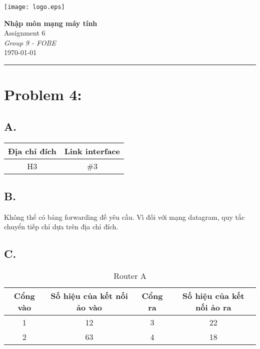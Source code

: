 \documentclass[12pt,a4paper]{article}
\begin{document}
\textcolor{UM_Brown}{
\begin{minipage}{0.1\textwidth}
    \begin{flushleft}
        \texttt{[image: logo.eps]}
    \end{flushleft}
\end{minipage}
\begin{minipage}{0.8\textwidth}
    \begin{center}
        \textbf{\Large Nhập môn mạng máy tính}\\
        \vspace{5pt}
        Assignment 6 \\
        \vspace{10pt}
        \textit{Group 9 - FOBE} \\
        \vspace{5pt}
        \longdate\today
    \end{center}
\end{minipage}
\vspace{10pt}
\hrule
}

\section*{Problem 4:}
\subsection*{A.}
\begin{table}[H]
    \centering
    \begin{tabular}{|c|c|}
    \toprule
     \bf{Địa chỉ đích}  & \textbf{Link interface} \\
     \midrule
     H3 & \#3 \\
     \bottomrule
    \end{tabular}
\end{table}

\subsection*{B.}
Không thể có bảng forwarding đề yêu cầu. Vì đối với mạng datagram, quy tắc chuyển tiếp chỉ dựa trên địa chỉ đích.

\subsection*{C.}
\begin{table}[H]
    \caption*{Router A}
    \centering
    \begin{tabular}{|c|c|c|c|}
    \toprule
     \bf{Cổng vào}  & \textbf{Số hiệu của kết nối ảo vào} & \textbf{Cổng ra} & \textbf{Số hiệu của kết nối ảo ra} \\
     \midrule
     1 & 12 & 3 & 22 \\
     \midrule
     2 & 63 & 4 & 18 \\
     \bottomrule
    \end{tabular}
\end{table}
\end{document}
